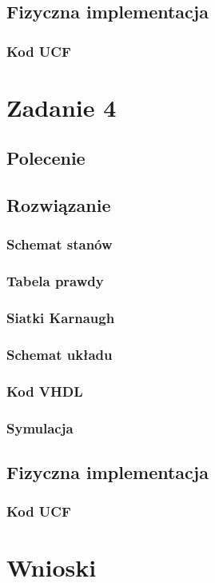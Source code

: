\documentclass[a4paper,12pt]{extarticle}  %
\begin{document}
\subsection{Fizyczna implementacja}
\subsubsection{Kod UCF}

\section{Zadanie 4}
\subsection{Polecenie}
\subsection{Rozwiązanie}
\subsubsection{Schemat stanów}
\subsubsection{Tabela prawdy}
\subsubsection{Siatki Karnaugh}
\subsubsection{Schemat układu}
\subsubsection{Kod VHDL}
\subsubsection{Symulacja}
\subsection{Fizyczna implementacja}
\subsubsection{Kod UCF}

\section{Wnioski}

\end{document}
